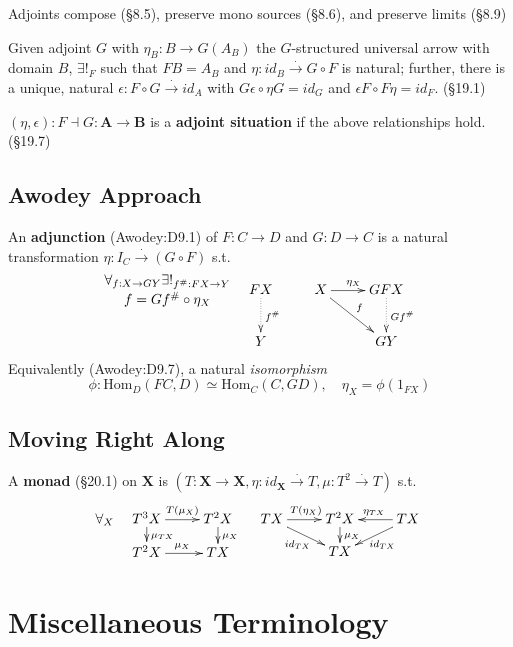 \documentclass[10pt,twocolumn,letterpaper]{article}
\newcommand{\natto}{\overset{\cdot}{\to}}
\newcommand{\defn}[1]{{\bf #1}}
\begin{document}
  Adjoints compose (\S8.5), preserve mono sources (\S8.6), and preserve
  limits (\S8.9)

  Given adjoint $G$ with $\eta_B : B \to G(A_B)$ the $G$-structured
  universal arrow with domain $B$, $\exists!_F$ such that $FB = A_B$ and
  $\eta : id_B \natto G \circ F$ is natural; further, there is a unique,
  natural $\epsilon : F \circ G \natto id_A$ with $G\epsilon \circ \eta G =
  id_G$ and $\epsilon F \circ F \eta = id_F$.  (\S19.1)

  $(\eta,\epsilon) : F \dashv G : \mathbf{A} \to \mathbf{B}$ is a
  \defn{adjoint situation} if the above relationships hold. (\S19.7)

\subsection{Awodey Approach}

  An \defn{adjunction} (Awodey:D9.1) of $F : C \to D$ and $G : D \to C$ is a natural
  transformation $\eta : I_C \stackrel{\cdot}{\to} (G\circ F)$ s.t.
  \[\xymatrix{
     {}\save[]+<-1cm,0cm>*\txt<8pc>{$\forall_{f:X \to GY}\exists!_{f^\#:FX\to Y}$\\
                                    $f = Gf^\# \circ \eta_X$}\restore
      & FX\ar@{..>}[d]^{f^\#} & X \ar[dr]^f \ar[r]^{\eta_X} & GFX \ar@{..>}[d]^{Gf^\#} \\
      & Y & & GY
  }\]
  Equivalently (Awodey:D9.7), a natural {\em isomorphism}
  \[ \phi : \mbox{Hom}_D(FC,D) \simeq \mbox{Hom}_C(C,GD), \quad \eta_X = \phi(1_{FX}) \]

\subsection{Moving Right Along}

  A \defn{monad} (\S20.1) on $\mathbf{X}$ is $(T : \mathbf{X} \to \mathbf{X},
  \eta : id_{\mathbf{X}} \natto T, \mu : T^2 \natto T)$ s.t.
  \[\forall_X \quad
  \xymatrix@R=10pt{
    T^3X \ar[r]^{T(\mu_X)} \ar[d]^{\mu_{TX}} & T^2X \ar[d]^{\mu_{X}} \\
    T^2X \ar[r]^{\mu_X}                 & TX
  } \quad \xymatrix@R=10pt{
    TX \ar[r]^{T(\eta_X)} \ar[dr]_{id_{TX}} & T^2X \ar[d]^{\mu_X} & TX \ar[l]_{\eta_{TX}} \ar[dl]^{id_{TX}} \\
        & TX & 
  }\]

\appendix
\section{Miscellaneous Terminology}
\end{document}
